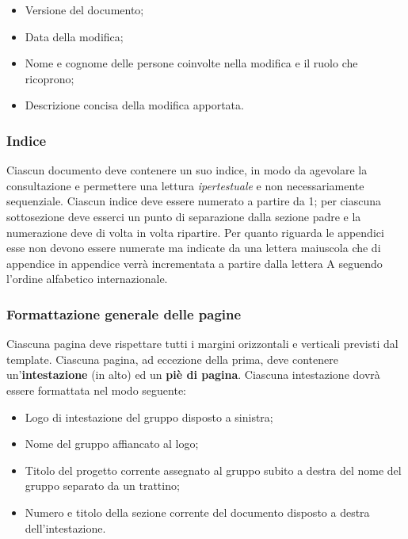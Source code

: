	\begin{itemize}
	
		\item Versione del documento;
		\item Data della modifica;
		\item Nome e cognome delle persone coinvolte nella modifica e il ruolo che ricoprono;
		\item Descrizione concisa della modifica apportata.
	
	\end{itemize}
	
	\subsubsection{Indice}
	
	Ciascun documento deve contenere un suo indice, in modo da agevolare la consultazione e permettere una lettura \textit{ipertestuale} e non necessariamente sequenziale. Ciascun indice deve essere numerato a partire da 1; per ciascuna sottosezione deve esserci un punto di separazione dalla sezione padre e la numerazione deve di volta in volta ripartire. Per quanto riguarda le appendici esse non devono essere numerate ma indicate da una lettera maiuscola che di appendice in appendice verrà incrementata a partire dalla lettera A seguendo l'ordine alfabetico internazionale.
	
	\subsubsection{Formattazione generale delle pagine}
	
	Ciascuna pagina deve rispettare tutti i margini orizzontali e verticali previsti dal template. Ciascuna pagina, ad eccezione della prima, deve contenere un'\textbf{intestazione} (in alto) ed un \textbf{piè di pagina}. Ciascuna intestazione dovrà essere formattata nel modo seguente:

	\begin{itemize}
	
		\item Logo di intestazione del gruppo disposto a sinistra;
		\item Nome del gruppo affiancato al logo;
		\item Titolo del progetto corrente assegnato al gruppo subito a destra del nome del gruppo separato da un trattino;
		\item Numero e titolo della sezione corrente del documento disposto a destra dell'intestazione.
	
	\end{itemize}
	
